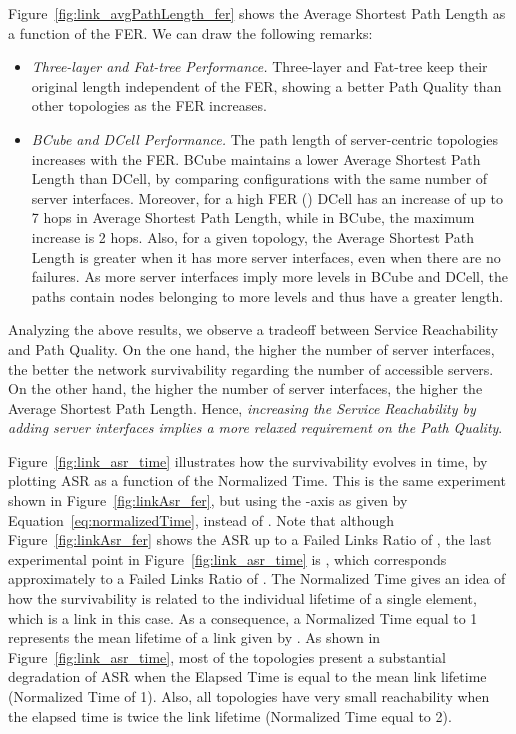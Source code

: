 Figure~\ref{fig:link_avgPathLength_fer} shows the Average Shortest Path Length as a function of the FER. We can draw the following remarks:
\begin{itemize}
\item \textit{Three-layer and Fat-tree Performance.} Three-layer and Fat-tree keep their original length independent of the FER, showing a better Path Quality than other topologies as the FER increases.
\item \textit{BCube and DCell Performance.} The path length of server-centric topologies increases with the FER. BCube maintains a lower Average Shortest Path Length than DCell, by comparing configurations with the same number of server interfaces. Moreover, for a high FER () DCell has an increase of up to 7 hops in Average Shortest Path Length, while in BCube, the maximum increase is 2 hops. Also, for a given topology, the Average Shortest Path Length is greater when it has more server interfaces, even when there are no failures. As more server interfaces imply more levels in BCube and DCell, the paths contain nodes belonging to more levels and thus have a greater length.
\end{itemize}

Analyzing the above results, we observe a tradeoff between Service Reachability and Path Quality. On the one hand, the higher the number of server interfaces, the better the network survivability regarding the number of accessible servers. On the other hand, the higher the number of server interfaces, the higher the Average Shortest Path Length. Hence, \textit{increasing the Service Reachability by adding server interfaces implies a more relaxed requirement on the Path Quality}. 

Figure~\ref{fig:link_asr_time} illustrates how the survivability evolves in time, by plotting ASR as a function of the Normalized Time.
This is the same experiment shown in Figure~\ref{fig:linkAsr_fer}, but using the -axis as given by Equation~\ref{eq:normalizedTime}, instead of . 
Note that although Figure~\ref{fig:linkAsr_fer} shows the ASR up to a Failed Links Ratio of , the last experimental point in Figure~\ref{fig:link_asr_time} is , which corresponds approximately to a Failed Links Ratio of .
The Normalized Time gives an idea of how the survivability is related to the individual lifetime of a single element, which is a link in this case. As a consequence, a Normalized Time equal to 1 represents the mean lifetime of a link given by . As shown in Figure~\ref{fig:link_asr_time}, most of the topologies present a substantial degradation of ASR when the Elapsed Time is equal to the mean link lifetime (Normalized Time of 1). Also, all topologies have very small reachability when the elapsed time is twice the link lifetime (Normalized Time equal to 2).
